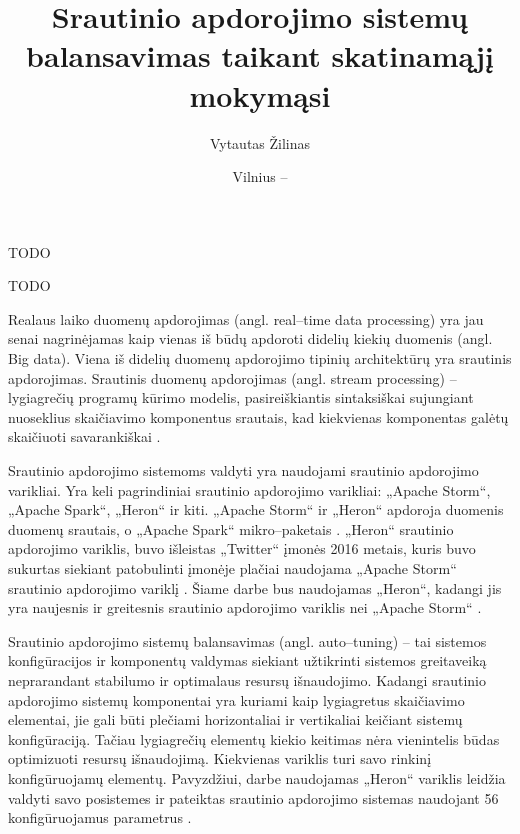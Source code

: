 \documentclass{VUMIFPSbakalaurinis}
\title{Srautinio apdorojimo sistemų balansavimas taikant skatinamąjį mokymąsi}
\author{Vytautas Žilinas}
\date{Vilnius – \the\year}
\begin{document}
 
\maketitle

\cleardoublepage{}
\setcounter{page}{2}

TODO

TODO

\tableofcontents


Realaus laiko duomenų apdorojimas (angl. real–time data processing) yra jau senai nagrinėjamas kaip vienas iš būdų apdoroti didelių kiekių duomenis (angl. Big data). Viena iš didelių duomenų apdorojimo tipinių architektūrų yra srautinis apdorojimas. Srautinis duomenų apdorojimas (angl. stream processing) – lygiagrečių programų kūrimo modelis, pasireiškiantis sintaksiškai sujungiant nuoseklius skaičiavimo komponentus srautais, kad kiekvienas komponentas galėtų skaičiuoti savarankiškai \cite{shortstreamproc}. 

Srautinio apdorojimo sistemoms valdyti yra naudojami srautinio apdorojimo varikliai. Yra keli pagrindiniai srautinio apdorojimo varikliai: „Apache Storm“, „Apache Spark“, „Heron“ ir kiti. „Apache Storm“ ir „Heron“ apdoroja duomenis duomenų srautais, o „Apache Spark“ mikro–paketais \cite{karau2015learning}. „Heron“ srautinio apdorojimo variklis, buvo išleistas „Twitter“ įmonės 2016 metais, kuris buvo sukurtas siekiant patobulinti įmonėje plačiai naudojama „Apache Storm“ srautinio apdorojimo variklį \cite{openSourcing}. Šiame darbe bus naudojamas „Heron“, kadangi jis yra naujesnis ir greitesnis srautinio apdorojimo variklis nei „Apache Storm“ \cite{twitterHeron}. 

Srautinio apdorojimo sistemų balansavimas (angl. auto–tuning) – tai sistemos konfigūracijos ir komponentų valdymas siekiant užtikrinti sistemos greitaveiką neprarandant stabilumo ir optimalaus resursų išnaudojimo. Kadangi srautinio apdorojimo sistemų komponentai yra kuriami kaip lygiagretus skaičiavimo elementai, jie gali būti plečiami horizontaliai ir vertikaliai \cite{shortstreamproc} keičiant sistemų konfigūraciją. Tačiau lygiagrečių elementų kiekio keitimas nėra vienintelis būdas optimizuoti resursų išnaudojimą. Kiekvienas variklis turi savo rinkinį konfigūruojamų elementų. Pavyzdžiui, darbe naudojamas „Heron“ variklis leidžia valdyti savo posistemes ir pateiktas srautinio apdorojimo sistemas naudojant 56 konfigūruojamus parametrus \cite{configDocument}.
\end{document}
